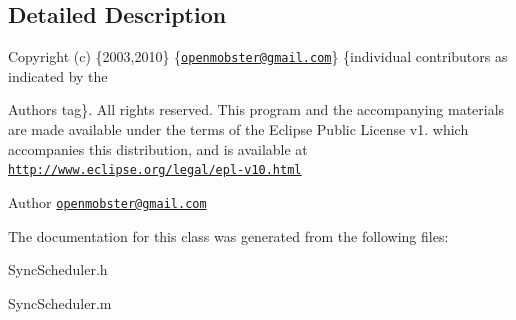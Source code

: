 \subsection{\-Detailed \-Description}
\-Copyright (c) \{2003,2010\} \{\href{mailto:openmobster@gmail.com}{\tt openmobster@gmail.\-com}\} \{individual contributors as indicated by the \begin{DoxyAuthor}{\-Authors}
tag\}. \-All rights reserved. \-This program and the accompanying materials are made available under the terms of the \-Eclipse \-Public \-License v1. which accompanies this distribution, and is available at \href{http://www.eclipse.org/legal/epl-v10.html}{\tt http\-://www.\-eclipse.\-org/legal/epl-\/v10.\-html}
\end{DoxyAuthor}
\begin{DoxyAuthor}{\-Author}
\href{mailto:openmobster@gmail.com}{\tt openmobster@gmail.\-com} 
\end{DoxyAuthor}


\-The documentation for this class was generated from the following files\-:\begin{DoxyCompactItemize}
\item 
\-Sync\-Scheduler.\-h\item 
\-Sync\-Scheduler.\-m\end{DoxyCompactItemize}
